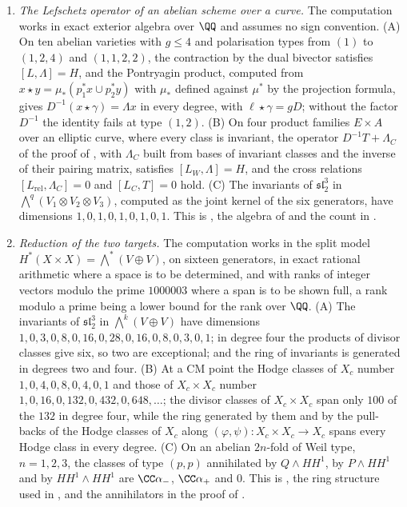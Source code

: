 \begin{enumerate}[label=\textup{(\Roman*)},leftmargin=*]
\item \emph{The Lefschetz operator of an abelian scheme over a curve.} The
  computation works in exact exterior algebra over $\QQ$ and assumes no sign
  convention. (A) On ten abelian varieties with $g\le4$ and polarisation
  types from $(1)$ to $(1,2,4)$ and
  $(1,1,2,2)$, the contraction by the dual bivector satisfies
  $[L,\Lambda]=H$, and the Pontryagin product, computed from
  $x\star y=\mu_{*}(p_{1}^{*}x\cup p_{2}^{*}y)$ with $\mu_{*}$ defined against
  $\mu^{*}$ by the projection formula, gives $D^{-1}(x\star\gamma)=\Lambda x$
  in every degree, with $\ell\star\gamma=gD$; without the factor $D^{-1}$ the
  identity fails at type $(1,2)$. (B) On four product families $E\times A$
  over an elliptic curve, where every class is invariant, the operator
  $D^{-1}T+\Lambda_{C}$ of the proof of , with
  $\Lambda_{C}$ built from bases of invariant classes and the inverse of their
  pairing matrix, satisfies $[L_{W},\Lambda]=H$, and the cross relations
  $[L_{\mathrm{rel}},\Lambda_{C}]=0$ and $[L_{C},T]=0$ hold. (C) The invariants
  of $\mathfrak{sl}_{2}^{3}$ in $\bigwedge^{q}(V_{1}\otimes V_{2}\otimes V_{3})$,
  computed as the joint kernel of the six generators, have dimensions
  $1,0,1,0,1,0,1,0,1$. This is , the algebra of
   and the count in .

\item \emph{Reduction of the two targets.} The computation works in the
  split model $H^{*}(X\times X)=\bigwedge^{*}(V\oplus V)$, on sixteen
  generators, in exact rational arithmetic where a space is to be
  determined, and with ranks of integer vectors modulo the prime $1000003$
  where a span is to be shown full, a rank modulo a prime being a lower bound
  for the rank over $\QQ$. (A) The invariants of $\mathfrak{sl}_{2}^{3}$ in $\bigwedge^{k}(V\oplus V)$ have
  dimensions $1,0,3,0,8,0,16,0,28,0,16,0,8,0,3,0,1$; in degree four the
  products of divisor classes give six, so two are exceptional; and the ring
  of invariants is generated in degrees two and four. (B) At a CM point the
  Hodge classes of $X_{c}$ number $1,0,4,0,8,0,4,0,1$ and those of
  $X_{c}\times X_{c}$ number $1,0,16,0,132,0,432,0,648,\dots$; the divisor
  classes of $X_{c}\times X_{c}$ span only $100$ of the $132$ in degree four,
  while the ring generated by them and by the pull-backs of the Hodge classes of
  $X_{c}$ along $(\varphi,\psi)\colon X_{c}\times X_{c}\to X_{c}$ spans every
  Hodge class in every degree. (C) On an abelian $2n$-fold of Weil type,
  $n=1,2,3$, the classes of type $(p,p)$ annihilated by $Q\wedge HH^{1}$, by
  $P\wedge HH^{1}$ and by $HH^{1}\wedge HH^{1}$ are $\CC\alpha_{-}$,
  $\CC\alpha_{+}$ and $0$. This is , the ring structure
  used in , and the annihilators in the proof of
  .


\end{enumerate}
